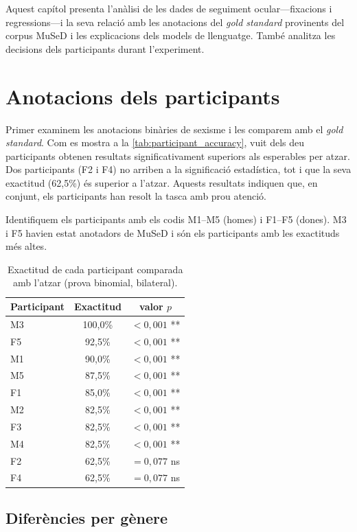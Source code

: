 Aquest capítol presenta l'anàlisi de les dades de seguiment ocular---fixacions i regressions---i la seva relació amb les anotacions del \textit{gold standard} provinents del corpus MuSeD i les explicacions dels models de llenguatge. També analitza les decisions dels participants durant l'experiment.

\section{Anotacions dels participants}

Primer examinem les anotacions binàries de sexisme i les comparem amb el \textit{gold standard}.
Com es mostra a la \autoref{tab:participant_accuracy}, vuit dels deu participants obtenen resultats significativament superiors als esperables per atzar.
Dos participants (F2 i F4) no arriben a la significació estadística, tot i que la seva exactitud (62,5\%) és superior a l'atzar.
Aquests resultats indiquen que, en conjunt, els participants han resolt la tasca amb prou atenció.

Identifiquem els participants amb els codis M1--M5 (homes) i F1--F5 (dones).
M3 i F5 havien estat anotadors de MuSeD i són els participants amb les exactituds més altes.

\iftables
\begin{table}[htbp]
\small
\centering
\begin{tabular}{lcc}
\toprule
\textbf{Participant} & \textbf{Exactitud} & \textbf{valor $p$} \\
\midrule
M3 & 100,0\% & $< 0,001$ ** \\
F5 &  92,5\% & $< 0,001$ ** \\
M1 &  90,0\% & $< 0,001$ ** \\
M5 &  87,5\% & $< 0,001$ ** \\
F1 &  85,0\% & $< 0,001$ ** \\
M2 &  82,5\% & $< 0,001$ ** \\
F3 &  82,5\% & $< 0,001$ ** \\
M4 &  82,5\% & $< 0,001$ ** \\
F2 &  62,5\% & $= 0,077$ ns \\
F4 &  62,5\% & $= 0,077$ ns \\
\bottomrule
\end{tabular}
\caption{Exactitud de cada participant comparada amb l'atzar (prova binomial, bilateral).}
\label{tab:participant_accuracy}
\end{table}
\fi

\subsection{Diferències per gènere}

